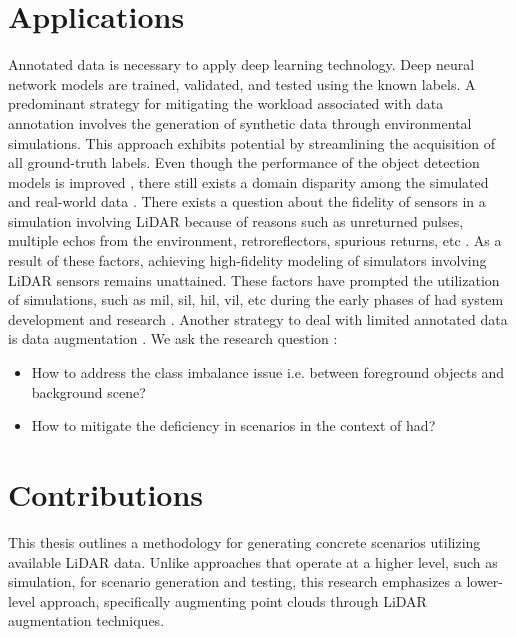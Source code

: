 \section{Applications}
Annotated data is necessary to apply deep learning technology. Deep neural network models are trained, validated, and tested using the known labels. A predominant strategy for mitigating the workload associated with data annotation involves the generation of synthetic data through environmental simulations. This approach exhibits potential by streamlining the acquisition of all ground-truth labels. Even though the performance of the object detection models is improved \parencite{johnsonroberson2017driving}, there still exists a domain disparity among the simulated and real-world data \parencite{care_real_and_syn_gap}. There exists a question about the fidelity of sensors in a simulation involving LiDAR because of reasons such as unreturned pulses, multiple echos from the environment, retroreflectors, spurious returns, etc \parencite{zero_domain_gap}. As a result of these factors, achieving high-fidelity modeling of simulators involving LiDAR sensors remains unattained. These factors have prompted the utilization of simulations, such as \acrfull{mil}, \acrfull{sil}, \acrfull{hil}, \acrfull{vil}, etc during the early phases of \acrshort{had} system development and research \parencite{x_in_loop}. Another strategy to deal with limited annotated data is data augmentation \parencite{lidar_aug}. We ask the research question : 
\begin{itemize}
    \item How to address the class imbalance issue i.e. between foreground objects and background scene?
    \item How to mitigate the deficiency in scenarios in the context of \acrshort{had}?
\end{itemize}

\section{Contributions}

This thesis outlines a methodology for generating concrete scenarios utilizing available LiDAR data. Unlike approaches that operate at a higher level, such as simulation, for scenario generation and testing, this research emphasizes a lower-level approach, specifically augmenting point clouds through LiDAR augmentation techniques.

